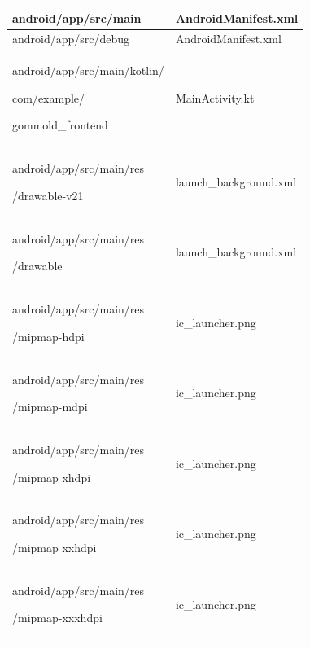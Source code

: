 \documentclass[conference]{IEEEtran}
\begin{document}
\begin{table}[h]
\begin{tabular}{|p{3.7cm}|p{4.1cm}|}
          android/app/src/main \par   & \par AndroidManifest.xml
          \\ \hline

          android/app/src/debug \par   & \par AndroidManifest.xml
          \\ \hline

          android/app/src/main/kotlin/ \par com/example/\par gommold\_frontend  \par & \par MainActivity.kt
          \\ \hline

          android/app/src/main/res \par /drawable-v21 \par   & \par launch\_background.xml
          \\ \hline

          android/app/src/main/res \par /drawable \par   & \par launch\_background.xml
          \\ \hline

          android/app/src/main/res  \par /mipmap-hdpi \par   & \par ic\_launcher.png
          \\ \hline

          android/app/src/main/res \par /mipmap-mdpi \par   & \par ic\_launcher.png
          \\ \hline

          android/app/src/main/res \par /mipmap-xhdpi \par   & \par ic\_launcher.png
          \\ \hline

          android/app/src/main/res  \par /mipmap-xxhdpi \par   & \par ic\_launcher.png
          \\ \hline
          
          android/app/src/main/res  \par /mipmap-xxxhdpi \par   & \par ic\_launcher.png
          \\ \hline

          
\end{tabular}
\end{table}
\end{document}
